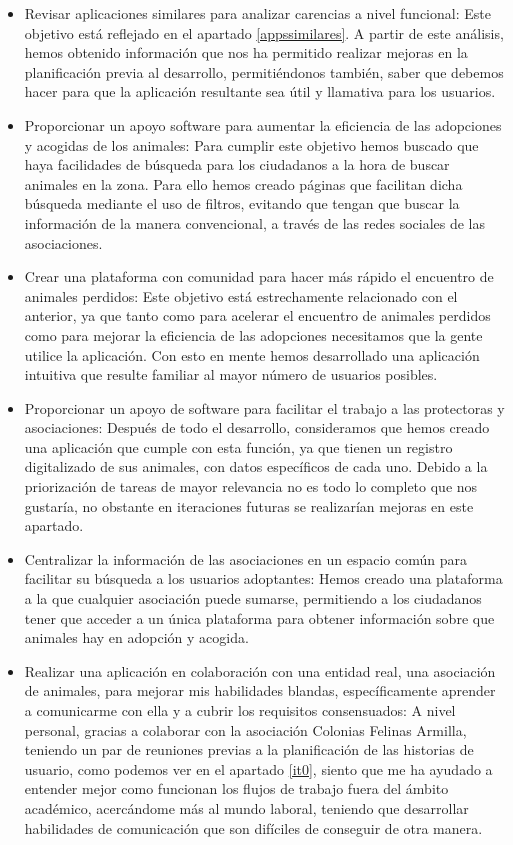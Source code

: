 \begin{itemize}
	\item Revisar aplicaciones similares para analizar carencias a nivel funcional: Este objetivo está reflejado en el apartado \ref{appssimilares}. A partir de este análisis, hemos obtenido información que nos ha permitido realizar mejoras en la planificación previa al desarrollo, permitiéndonos también, saber que debemos hacer para que la aplicación resultante sea útil y llamativa para los usuarios.
	
	\item Proporcionar un apoyo software para aumentar la eficiencia de las adopciones y acogidas de los animales: Para cumplir este objetivo hemos buscado que haya facilidades de búsqueda para los ciudadanos a la hora de buscar animales en la zona. Para ello hemos creado páginas que facilitan dicha búsqueda mediante el uso de filtros, evitando que tengan que buscar la información de la manera convencional, a través de las redes sociales de las asociaciones.
	
	\item Crear una plataforma con comunidad para hacer más rápido el encuentro de animales perdidos: Este objetivo está estrechamente relacionado con el anterior, ya que tanto como para acelerar el encuentro de animales perdidos como para mejorar la eficiencia de las adopciones necesitamos que la gente utilice la aplicación. Con esto en mente hemos desarrollado una aplicación intuitiva que resulte familiar al mayor número de usuarios posibles.
	
	\item Proporcionar un apoyo de software para facilitar el trabajo a las protectoras y asociaciones: Después de todo el desarrollo, consideramos que hemos creado una aplicación que cumple con esta función, ya que tienen un registro digitalizado de sus animales, con datos específicos de cada uno. Debido a la priorización de tareas de mayor relevancia no es todo lo completo que nos gustaría, no obstante en iteraciones futuras se realizarían mejoras en este apartado.
	
	\item Centralizar la información de las asociaciones en un espacio común para facilitar su búsqueda a los usuarios adoptantes: Hemos creado una plataforma a la que cualquier asociación puede sumarse, permitiendo a los ciudadanos tener que acceder a un única plataforma para obtener información sobre que animales hay en adopción y acogida.
	
	\item Realizar una aplicación en colaboración con una entidad real, una asociación de animales, para mejorar mis habilidades blandas, específicamente aprender a comunicarme con ella y a cubrir los requisitos consensuados: A nivel personal, gracias a colaborar con la asociación Colonias Felinas Armilla, teniendo un par de reuniones previas a la planificación de las historias de usuario, como podemos ver en el apartado \ref{it0}, siento que me ha ayudado a entender mejor como funcionan los flujos de trabajo fuera del ámbito académico, acercándome más al mundo laboral, teniendo que desarrollar habilidades de comunicación que son difíciles de conseguir de otra manera.
	

\end{itemize}
